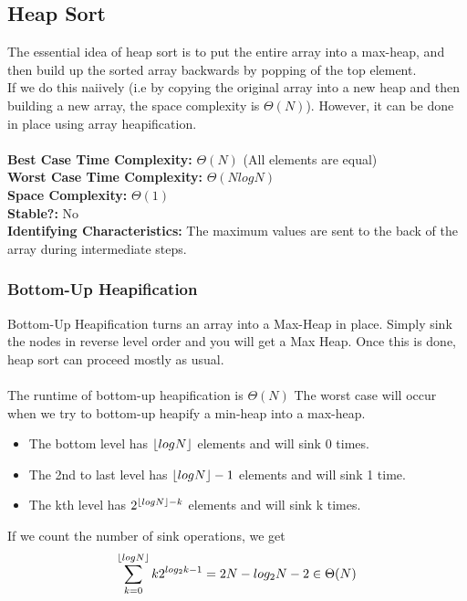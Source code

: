\documentclass{article}
\DeclarePairedDelimiter\floor{\lfloor}{\rfloor}
\begin{document}
\subsection{Heap Sort}
The essential idea of heap sort is to put the entire array into a max-heap, and then build up the sorted array backwards by popping of the top element.\\
If we do this naiively (i.e by copying the original array into a new heap and then building a new array, the space complexity is $\Theta(N)$). However, it can be done in place
using array heapification.\\\\
\textbf{Best Case Time Complexity: }$\Theta(N)$ (All elements are equal)\\
\textbf{Worst Case Time Complexity: }$\Theta(NlogN)$\\
\textbf{Space Complexity: }$\Theta(1)$\\
\textbf{Stable?: }No\\
\textbf{Identifying Characteristics: }The maximum values are sent to the back of the array during intermediate steps.
\subsubsection{Bottom-Up Heapification}
Bottom-Up Heapification turns an array into a Max-Heap in place. Simply sink the nodes in reverse level order and you will get a Max Heap.
Once this is done, heap sort can proceed mostly as usual.\\\\
The runtime of bottom-up heapification is $\Theta(N)$
The worst case will occur when we try to bottom-up heapify a min-heap into a max-heap.
\begin{itemize}
    \item The bottom level has $\floor{logN}$ elements and will sink 0 times.
    \item The 2nd to last level has $\floor{logN} - 1$ elements and will sink 1 time.
    \item The kth level has $2^{\floor{logN}-k}$ elements and will sink k times.
\end{itemize}
If we count the number of sink operations, we get $$\sum_{k=0}^{\floor{logN}}{k2^{log_2k-1}} = 2N - log_2N - 2 \in \Theta(N)$$
\end{document}
